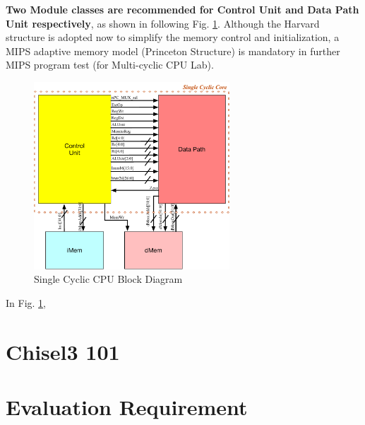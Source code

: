 \documentclass[a4paper]{article}
\begin{document}
\textbf{Two Module classes are recommended for Control Unit and Data Path Unit respectively}, as shown in following Fig. \ref{fig:modules}. Although the Harvard structure is adopted now to simplify the memory control and initialization, a MIPS adaptive memory model (Princeton Structure) is mandatory in further MIPS program test (for Multi-cyclic CPU Lab).  
\begin{figure}[ht]
 \centering
 \includegraphics[height=7cm]{images/l1modules.pdf}
 \caption{Single Cyclic CPU Block Diagram}
 \label{fig:modules}
\end{figure}
In Fig. \ref{fig:modules}, 

\newpage
\section{Chisel3 101} \label{Datatypes}%
	
 

\newpage
\section{Evaluation Requirement} \label{Functions}%

\end{document}
